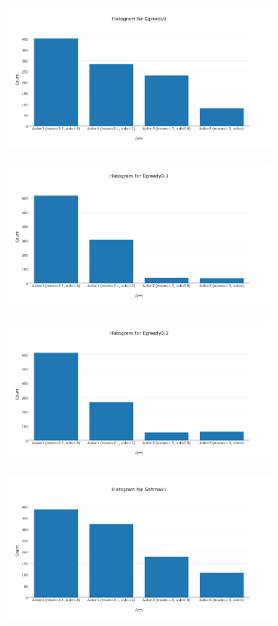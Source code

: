 \documentclass[11pt]{article}
\begin{document}
\begin{figure}[H]
   \centering
   \includegraphics[width=0.7\textwidth]{img/1-2/h2.png}
\end{figure}

\begin{figure}[H]
   \centering
   \includegraphics[width=0.7\textwidth]{img/1-2/h3.png}
\end{figure}

\begin{figure}[H]
   \centering
   \includegraphics[width=0.7\textwidth]{img/1-2/h4.png}
\end{figure}

\begin{figure}[H]
   \centering
   \includegraphics[width=0.7\textwidth]{img/1-2/h5.png}
\end{figure}
\end{document}
